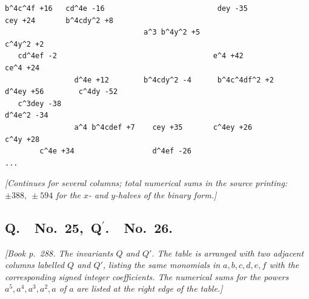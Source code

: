 \documentclass[11pt]{article}
\begin{document}
\begin{small}
\begin{verbatim}
b^4c^4f +16   cd^4e -16                          dey -35             cey +24       b^4cdy^2 +8
                                a^3 b^4y^2 +5                                       c^4y^2 +2
   cd^4ef -2                                    e^4 +42             ce^4 +24
                d^4e +12        b^4cdy^2 -4      b^4c^4df^2 +2      d^4ey +56        c^4dy -52
   c^3dey -38                                                       d^4e^2 -34
                a^4 b^4cdef +7    cey +35       c^4ey +26                            c^4y +28
        c^4e +34                  d^4ef -26                                                 ...
\end{verbatim}
\end{small}

\textit{[Continues for several columns; total numerical sums in the source printing: $\pm 388,\ \pm 594$ for the $x$- and $y$-halves of the binary form.]}

\bigskip

\subsection*{Q.\ \ No.\ 25,\ Q$^\prime$.\ \ No.\ 26.}

\textit{[Book p.~288. The invariants $Q$ and $Q'$. The table is arranged with two adjacent columns labelled $Q$ and $Q'$, listing the same monomials in $a,b,c,d,e,f$ with the corresponding signed integer coefficients. The numerical sums for the powers $a^5, a^4, a^3, a^2, a$ of $a$ are listed at the right edge of the table.]}

\smallskip
\end{document}

